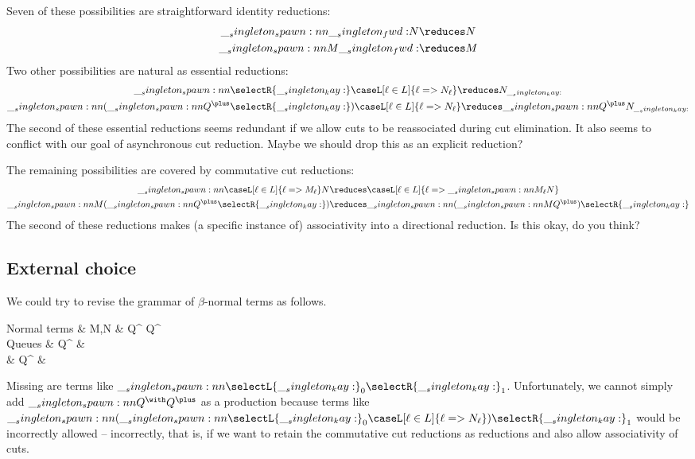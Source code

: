 Seven of these possibilities are straightforward identity reductions:
\begin{gather*}
  \spawn{\fwd}{N} \reduces N
  \\
  \spawn{M}{\fwd} \reduces M
\end{gather*}
Two other possibilities are natural as essential reductions:
\begin{gather*}
  \spawn{\selectR{\kay}}
        {\caseL[\ell \in L]{\ell => N_{\ell}}}
    \reduces
    N_{\kay}
  \\
  \spawn{(\spawn{Q^{\plus}}{\selectR{\kay}})}
        {\caseL[\ell \in L]{\ell => N_{\ell}}}
    \reduces
    \spawn{Q^{\plus}}{N_{\kay}}
\end{gather*}
The second of these essential reductions seems redundant if we allow cuts to be reassociated during cut elimination.
It also seems to conflict with our goal of asynchronous cut reduction.
Maybe we should drop this as an explicit reduction?

The remaining possibilities are covered by commutative cut reductions:
\begin{gather*}
  \spawn{\caseL[\ell \in L]{\ell => M_{\ell}}}
        {N}
    \reduces
    \caseL[\ell \in L]{\ell => \spawn{M_{\ell}}{N}}
  \\
  \spawn{M}{(\spawn{Q^{\plus}}{\selectR{\kay}})}
    \reduces
    \spawn{(\spawn{M}{Q^{\plus}})}{\selectR{\kay}}
\end{gather*}
The second of these reductions makes (a specific instance of) associativity into a directional reduction.
Is this okay, do you think?

\subsection{External choice}

We could try to revise the grammar of $\beta$-normal terms as follows.
\begin{syntax*}
  Normal terms & M,N &
    \fwd \mid Q^{\plus} \mid Q^{\with}
  \\
  Q{ueues} & Q^{\plus} &
    \selectR{\kay} \mid {} \mid {}
  \\
  & Q^{\with} &
    \selectL{\kay} \mid {} \mid {}
\end{syntax*}
Missing are terms like $\spawn{\selectL{\kay}_0}{\selectR{\kay}_1}$.
Unfortunately, we cannot simply add $\spawn{Q^{\with}}{Q^{\plus}}$ as a production because terms like $\spawn{(\spawn{\selectL{\kay}_0}{\caseL[\ell \in L]{\ell => N_{\ell}}})}{\selectR{\kay}_1}$ would be incorrectly allowed -- incorrectly, that is, if we want to retain the commutative cut reductions as reductions and also allow associativity of cuts.

